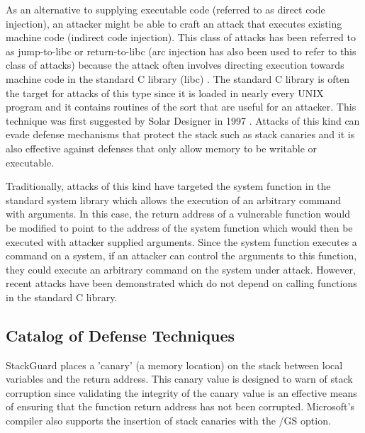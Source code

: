  As an alternative to supplying
executable code (referred to as direct code injection), an attacker
might be able to craft an attack that executes existing machine code
(indirect code injection). This class of attacks has been referred to
as jump-to-libc or return-to-libc (arc injection
\cite{cowan2000buffer} has also been used to refer to this class of
attacks) because the attack often involves directing execution towards
machine code in the standard C library (libc)
\cite{cowan2000buffer}. The standard C library is often the target for
attacks of this type since it is loaded in nearly every UNIX program
and it contains routines of the sort that are useful for an
attacker. This technique was first suggested by Solar Designer in 1997
\cite{designer1997return}. Attacks of this kind can evade defense
mechanisms that protect the stack such as stack canaries and it is
also effective against defenses that only allow memory to be writable
or executable.

Traditionally, attacks of this kind have targeted the system function
in the standard system library which allows the execution of an
arbitrary command with arguments. In this case, the return address of
a vulnerable function would be modified to point to the address of the
system function which would then be executed with attacker supplied
arguments. Since the system function executes a command on a system,
if an attacker can control the arguments to this function, they could
execute an arbitrary command on the system under attack. However,
recent attacks have been demonstrated which do not depend on calling
functions in the standard C library.


\subsection{Catalog of Defense Techniques}

 StackGuard \cite{stackguard-98} places a
'canary' (a memory location) on the stack between local variables and
the return address. This canary value is designed to warn of stack
corruption since validating the integrity of the canary value is an
effective means of ensuring that the function return address has not
been corrupted. Microsoft's compiler also supports the insertion of
stack canaries with the /GS option.

